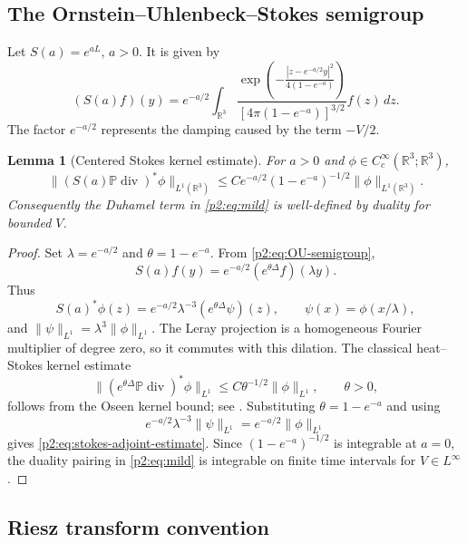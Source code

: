 \documentclass[11pt]{amsart}
\theoremstyle{plain}
\newtheorem{lemma}[lemma]{Lemma}
\theoremstyle{definition}
\theoremstyle{remark}
\numberwithin{equation}{section}
\newcommand{\R}{\mathbb R}
\newcommand{\divergence}{\operatorname{div}}
\begin{document}
\subsection{The Ornstein--Uhlenbeck--Stokes semigroup}

Let \(S(a)=e^{aL}\), \(a>0\).  It is given by
\begin{equation}\label{p2:eq:OU-semigroup}
   (S(a)f)(y)
   =
   e^{-a/2}
   \int_{\R^3}
   \frac{\exp\!\left(-\frac{|z-e^{-a/2}y|^2}{4(1-e^{-a})}\right)}
        {[4\pi(1-e^{-a})]^{3/2}}
   f(z)\,dz .
\end{equation}
The factor \(e^{-a/2}\) represents the damping caused by the term \(-V/2\).

\begin{lemma}[Centered Stokes kernel estimate]\label{p2:lem:centered-stokes-kernel}
For \(a>0\) and \(\phi\in C_c^\infty(\R^3;\R^3)\),
\begin{equation}\label{p2:eq:stokes-adjoint-estimate}
   \|(S(a)\mathbb P\divergence)^*\phi\|_{L^1(\R^3)}
   \le
   C e^{-a/2}(1-e^{-a})^{-1/2}\|\phi\|_{L^1(\R^3)}.
\end{equation}
Consequently the Duhamel term in \eqref{p2:eq:mild} is well-defined by duality
for bounded \(V\).
\end{lemma}

\begin{proof}
Set \(\lambda=e^{-a/2}\) and \(\theta=1-e^{-a}\).  From
\eqref{p2:eq:OU-semigroup},
\[
   S(a)f(y)=e^{-a/2}(e^{\theta\Delta}f)(\lambda y).
\]
Thus
\[
   S(a)^*\phi(z)
   =
   e^{-a/2}\lambda^{-3}
   (e^{\theta\Delta}\psi)(z),
   \qquad
   \psi(x)=\phi(x/\lambda),
\]
and \(\|\psi\|_{L^1}=\lambda^3\|\phi\|_{L^1}\).  The Leray projection is a
homogeneous Fourier multiplier of degree zero, so it commutes with this
dilation.  The classical heat--Stokes kernel estimate
\[
   \|(e^{\theta\Delta}\mathbb P\divergence)^*\phi\|_{L^1}
   \le C\theta^{-1/2}\|\phi\|_{L^1},
   \qquad \theta>0,
\]
follows from the Oseen kernel bound; see
\cite{FabesJonesRiviere1972,GigaMiyakawa1985,Sohr2001}.  Substituting
\(\theta=1-e^{-a}\) and using
\[
   e^{-a/2}\lambda^{-3}\|\psi\|_{L^1}=e^{-a/2}\|\phi\|_{L^1}
\]
gives \eqref{p2:eq:stokes-adjoint-estimate}.  Since
\((1-e^{-a})^{-1/2}\) is integrable at \(a=0\), the duality pairing in
\eqref{p2:eq:mild} is integrable on finite time intervals for
\(V\in L^\infty\).
\end{proof}

\subsection{Riesz transform convention}
\end{document}

